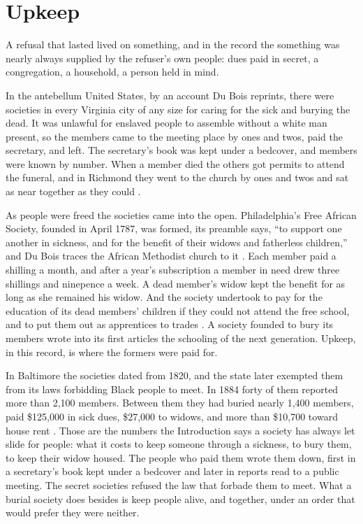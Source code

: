 \section{Upkeep}
\label{sec:reproduced.upkeep}
A refusal that lasted lived on something, and in the record the something was nearly always supplied by the refuser's own people: dues paid in secret, a congregation, a household, a person held in mind.

In the antebellum United States, by an account Du Bois reprints, there were societies in every Virginia city of any size for caring for the sick and burying the dead. It was unlawful for enslaved people to assemble without a white man present, so the members came to the meeting place by ones and twos, paid the secretary, and left. The secretary's book was kept under a bedcover, and members were known by number. When a member died the others got permits to attend the funeral, and in Richmond they went to the church by ones and twos and sat as near together as they could \autocite[20–21]{dubois1907economic}.

As people were freed the societies came into the open. Philadelphia's Free African Society, founded in April 1787, was formed, its preamble says, “to support one another in sickness, and for the benefit of their widows and fatherless children,” and Du Bois traces the African Methodist church to it \autocite[21]{dubois1907economic}. Each member paid a shilling a month, and after a year's subscription a member in need drew three shillings and ninepence a week. A dead member's widow kept the benefit for as long as she remained his widow. And the society undertook to pay for the education of its dead members' children if they could not attend the free school, and to put them out as apprentices to trades \autocite[21–22]{dubois1907economic}. A society founded to bury its members wrote into its first articles the schooling of the next generation. Upkeep, in this record, is where the formers were paid for.

In Baltimore the societies dated from 1820, and the state later exempted them from its laws forbidding Black people to meet. In 1884 forty of them reported more than 2,100 members. Between them they had buried nearly 1,400 members, paid \$125,000 in sick dues, \$27,000 to widows, and more than \$10,700 toward house rent \autocite[92–93]{dubois1907economic}. Those are the numbers the Introduction says a society has always let slide for people: what it costs to keep someone through a sickness, to bury them, to keep their widow housed. The people who paid them wrote them down, first in a secretary's book kept under a bedcover and later in reports read to a public meeting. The secret societies refused the law that forbade them to meet. What a burial society does besides is keep people alive, and together, under an order that would prefer they were neither.

